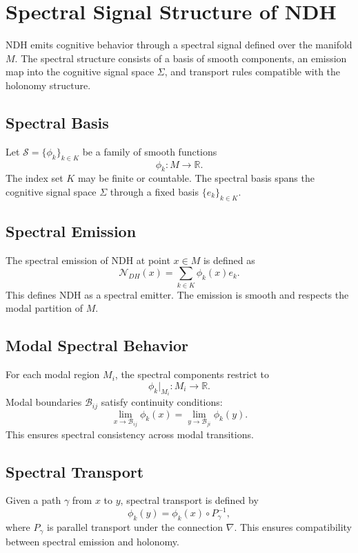 \section{Spectral Signal Structure of NDH}
\label{sec:ndh-spectral-signal}

NDH emits cognitive behavior through a spectral signal defined over the manifold
$M$. The spectral structure consists of a basis of smooth components, an emission
map into the cognitive signal space $\Sigma$, and transport rules compatible with
the holonomy structure.

\subsection{Spectral Basis}

Let $\mathcal{S} = \{\phi_k\}_{k \in K}$ be a family of smooth functions
\[
\phi_k : M \to \mathbb{R}.
\]
The index set $K$ may be finite or countable. The spectral basis spans the
cognitive signal space $\Sigma$ through a fixed basis $\{e_k\}_{k \in K}$.

\subsection{Spectral Emission}

The spectral emission of NDH at point $x \in M$ is defined as
\[
\mathcal{N}_{DH}(x)
  = \sum_{k \in K} \phi_k(x) e_k.
\]
This defines NDH as a spectral emitter. The emission is smooth and respects the
modal partition of $M$.

\subsection{Modal Spectral Behavior}

For each modal region $M_i$, the spectral components restrict to
\[
\phi_k|_{M_i} : M_i \to \mathbb{R}.
\]
Modal boundaries $\mathcal{B}_{ij}$ satisfy continuity conditions:
\[
\lim_{x \to \mathcal{B}_{ij}} \phi_k(x)
  = \lim_{y \to \mathcal{B}_{ji}} \phi_k(y).
\]
This ensures spectral consistency across modal transitions.

\subsection{Spectral Transport}

Given a path $\gamma$ from $x$ to $y$, spectral transport is defined by
\[
\phi_k(y) = \phi_k(x) \circ P_\gamma^{-1},
\]
where $P_\gamma$ is parallel transport under the connection $\nabla$. This
ensures compatibility between spectral emission and holonomy.

